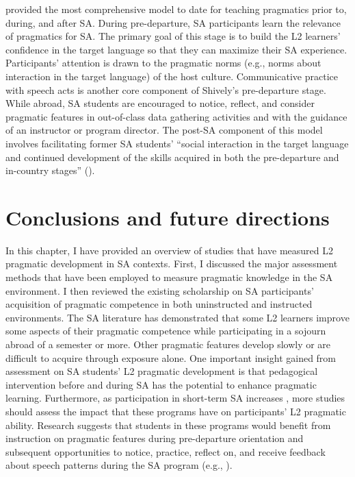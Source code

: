 \documentclass[output=paper]{langscibook}
\begin{document}
  \citet{Shively2010} provided the most comprehensive model to date for teaching pragmatics prior to, during, and after SA. During pre-departure, SA participants learn the relevance of pragmatics for SA. The primary goal of this stage is to build the L2 learners’ confidence in the target language so that they can maximize their SA experience. Participants’ attention is drawn to the pragmatic norms (e.g., norms about interaction in the target language) of the host culture. Communicative practice with speech acts is another core component of Shively’s pre-departure stage. While abroad, SA students are encouraged to notice, reflect, and consider pragmatic features in out-of-class data gathering activities and with the guidance of an instructor or program director. The post-SA component of this model involves facilitating former SA students’ “social interaction in the target language and continued development of the skills acquired in both the pre-departure and in-country stages” (\citeyear[123]{Shively2010}).

\section{Conclusions and future directions}

  In this chapter, I have provided an overview of studies that have measured L2 pragmatic development in SA contexts. First, I discussed the major assessment methods that have been employed to measure pragmatic knowledge in the SA environment. I then reviewed the existing scholarship on SA participants’ acquisition of pragmatic competence in both uninstructed and instructed environments. The SA literature has demonstrated that some L2 learners improve some aspects of their pragmatic competence while participating in a sojourn abroad of a semester or more. Other pragmatic features develop slowly or are difficult to acquire through exposure alone. One important insight gained from assessment on SA students’ L2 pragmatic development is that pedagogical intervention before and during SA has the potential to enhance pragmatic learning. Furthermore, as participation in short-term SA increases \citep{InstituteofInternationalEducation2017}, more studies should assess the impact that these programs have on participants’ L2 pragmatic ability. Research suggests that students in these programs would benefit from instruction on pragmatic features during pre-departure orientation and subsequent opportunities to notice, practice, reflect on, and receive feedback about speech patterns during the SA program (e.g., \citealt{HernándezInPress,HernándezBoero2018a,HernándezBoero2018b}).
\end{document}
